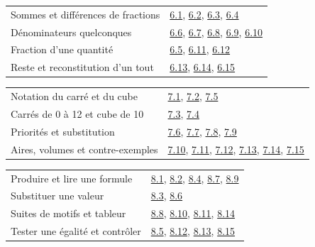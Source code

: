 \begin{tabularx}{\linewidth}{@{}Yl@{}}\toprule
Sommes et différences de fractions & \hyperref[exo-6-1]{6.1}, \hyperref[exo-6-2]{6.2}, \hyperref[exo-6-3]{6.3}, \hyperref[exo-6-4]{6.4}\\[2mm]
Dénominateurs quelconques & \hyperref[exo-6-6]{6.6}, \hyperref[exo-6-7]{6.7}, \hyperref[exo-6-8]{6.8}, \hyperref[exo-6-9]{6.9}, \hyperref[exo-6-10]{6.10}\\[2mm]
Fraction d’une quantité & \hyperref[exo-6-5]{6.5}, \hyperref[exo-6-11]{6.11}, \hyperref[exo-6-12]{6.12}\\[2mm]
Reste et reconstitution d’un tout & \hyperref[exo-6-13]{6.13}, \hyperref[exo-6-14]{6.14}, \hyperref[exo-6-15]{6.15}\\[2mm]
\bottomrule\end{tabularx}\par\vspace{4mm}
\clearpage
{}\fontsize{10}{13}\selectfont
{}\begin{tabularx}{\linewidth}{@{}Yl@{}}\toprule
Notation du carré et du cube & \hyperref[exo-7-1]{7.1}, \hyperref[exo-7-2]{7.2}, \hyperref[exo-7-5]{7.5}\\[2mm]
Carrés de 0 à 12 et cube de 10 & \hyperref[exo-7-3]{7.3}, \hyperref[exo-7-4]{7.4}\\[2mm]
Priorités et substitution & \hyperref[exo-7-6]{7.6}, \hyperref[exo-7-7]{7.7}, \hyperref[exo-7-8]{7.8}, \hyperref[exo-7-9]{7.9}\\[2mm]
Aires, volumes et contre-exemples & \hyperref[exo-7-10]{7.10}, \hyperref[exo-7-11]{7.11}, \hyperref[exo-7-12]{7.12}, \hyperref[exo-7-13]{7.13}, \hyperref[exo-7-14]{7.14}, \hyperref[exo-7-15]{7.15}\\[2mm]
\bottomrule\end{tabularx}\par\vspace{4mm}
\begin{tabularx}{\linewidth}{@{}Yl@{}}\toprule
Produire et lire une formule & \hyperref[exo-8-1]{8.1}, \hyperref[exo-8-2]{8.2}, \hyperref[exo-8-4]{8.4}, \hyperref[exo-8-7]{8.7}, \hyperref[exo-8-9]{8.9}\\[2mm]
Substituer une valeur & \hyperref[exo-8-3]{8.3}, \hyperref[exo-8-6]{8.6}\\[2mm]
Suites de motifs et tableur & \hyperref[exo-8-8]{8.8}, \hyperref[exo-8-10]{8.10}, \hyperref[exo-8-11]{8.11}, \hyperref[exo-8-14]{8.14}\\[2mm]
Tester une égalité et contrôler & \hyperref[exo-8-5]{8.5}, \hyperref[exo-8-12]{8.12}, \hyperref[exo-8-13]{8.13}, \hyperref[exo-8-15]{8.15}\\[2mm]
\bottomrule\end{tabularx}\par\vspace{4mm}
